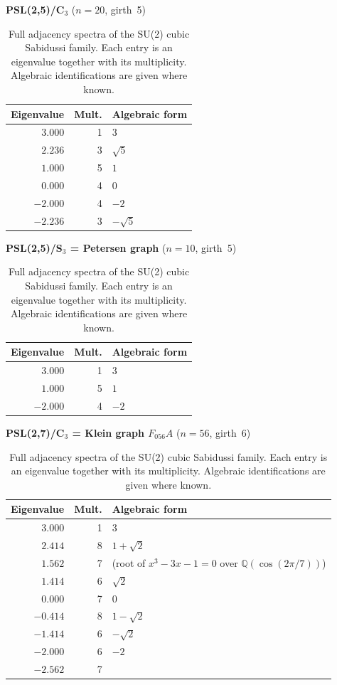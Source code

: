 \documentclass[11pt,a4paper]{amsart}
\theoremstyle{definition}
\theoremstyle{remark}
\newcommand{\Q}{\mathbb{Q}}
\begin{document}
\begin{table}[ht]
\caption{Full adjacency spectra of the SU(2) cubic Sabidussi family.
Each entry is an eigenvalue together with its multiplicity.
Algebraic identifications are given where known.}
\label{tab:spectra}
\footnotesize
\begin{center}

\medskip\noindent\textbf{PSL(2,5)/C$_3$} \quad ($n=20$, girth~5)
\smallskip

\begin{tabular}{rrl}
\toprule
Eigenvalue & Mult. & Algebraic form \\
\midrule
$3.000$ & 1 & $3$ \\
$2.236$ & 3 & $\sqrt{5}$ \\
$1.000$ & 5 & $1$ \\
$0.000$ & 4 & $0$ \\
$-2.000$ & 4 & $-2$ \\
$-2.236$ & 3 & $-\sqrt{5}$ \\
\bottomrule
\end{tabular}

\bigskip\noindent\textbf{PSL(2,5)/S$_3$ = Petersen graph} \quad ($n=10$, girth~5)
\smallskip

\begin{tabular}{rrl}
\toprule
Eigenvalue & Mult. & Algebraic form \\
\midrule
$3.000$ & 1 & $3$ \\
$1.000$ & 5 & $1$ \\
$-2.000$ & 4 & $-2$ \\
\bottomrule
\end{tabular}

\bigskip\noindent\textbf{PSL(2,7)/C$_3$ = Klein graph $F_{056}A$} \quad ($n=56$, girth~6)
\smallskip

\begin{tabular}{rrl}
\toprule
Eigenvalue & Mult. & Algebraic form \\
\midrule
$3.000$ & 1 & $3$ \\
$2.414$ & 8 & $1+\sqrt{2}$ \\
$1.562$ & 7 & (root of $x^3 - 3x - 1 = 0$ over $\Q(\cos(2\pi/7))$) \\
$1.414$ & 6 & $\sqrt{2}$ \\
$0.000$ & 7 & $0$ \\
$-0.414$ & 8 & $1-\sqrt{2}$ \\
$-1.414$ & 6 & $-\sqrt{2}$ \\
$-2.000$ & 6 & $-2$ \\
$-2.562$ & 7 & \\
\bottomrule
\end{tabular}


\end{center}
\end{table}
\end{document}

